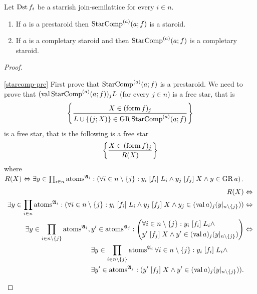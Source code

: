 \begin{thm}
\label{starcomp-is}Let $\operatorname{Dst} f_{i}$ be a starrish join-semilattice
for every $i\in n$.
\begin{enumerate}
\item \label{starcomp-pre}If $a$ is a prestaroid then $\operatorname{StarComp}^{(a)}(a;f)$
is a staroid.
\item \label{starcomp-compl}If $a$ is a completary staroid and then $\operatorname{StarComp}^{(a)}(a;f)$
is a completary staroid.
\end{enumerate}
\end{thm}
\begin{proof}
~
\begin{widedisorder}
\item [{\ref{starcomp-pre}}] First prove that $\operatorname{StarComp}^{(a)}(a;f)$ is a prestaroid.
We need to prove that $(\operatorname{val}\operatorname{StarComp}^{(a)}(a;f))_{j}L$ (for every $j\in n$)
is a free star, that is
\[
\left\{ \frac{X\in(\operatorname{form} f)_{j}}{L\cup\{(j;X)\}\in\operatorname{GR}\operatorname{StarComp}^{(a)}(a;f)}\right\}
\]
is a free star, that is the following is a free star
\[
\left\{ \frac{X\in(\operatorname{form} f)_{j}}{R(X)}\right\}
\]
where $R(X)\Leftrightarrow\exists y\in\prod_{i\in n}\operatorname{atoms}^{\mathfrak{A}_{i}}:\left(\forall i\in n\setminus\{j\}:y_{i}\mathrel{\left[f_{i}\right]}L_{i}\wedge y_{j}\mathrel{\left[f_{j}\right]}X\wedge y\in\operatorname{GR} a\right)$.
\begin{align*}
R(X) & \Leftrightarrow\\
\exists y\in\prod_{i\in n}\operatorname{atoms}^{\mathfrak{A}_{i}}:(\forall i\in n\setminus\{j\}:y_{i}\mathrel{\left[f_{i}\right]}L_{i}\land y_{j}\mathrel{\left[f_{j}\right]}X\land y_{j}\in(\operatorname{val} a)_{j}(y|_{n\setminus\{j\}})) & \Leftrightarrow\\
\exists y\in\prod_{i\in n\setminus\{j\}}\operatorname{atoms}^{\mathfrak{A}_{i}},y'\in\operatorname{atoms}^{\mathfrak{A}_{j}}:\left(\begin{aligned} & \forall i\in n\setminus\{j\}:y_{i}\mathrel{\left[f_{i}\right]}L_{i}\land\\
 & y'\mathrel{\left[f_{j}\right]}X\land y'\in(\operatorname{val} a)_{j}(y|_{n\setminus\{j\}})
\end{aligned}
\right) & \Leftrightarrow\\
\begin{aligned} & \exists y\in\prod_{i\in n\setminus\{j\}}\operatorname{atoms}^{\mathfrak{A}_{i}}\forall i\in n\setminus\{j\}:y_{i}\mathrel{\left[f_{i}\right]}L_{i}\land\\
 & \exists y'\in\operatorname{atoms}^{\mathfrak{A}_{j}}:(y'\mathrel{\left[f_{j}\right]}X\land y'\in(\operatorname{val} a)_{j}(y|_{n\setminus\{j\}})).
\end{aligned}
\end{align*}




\end{widedisorder}
\end{proof}
